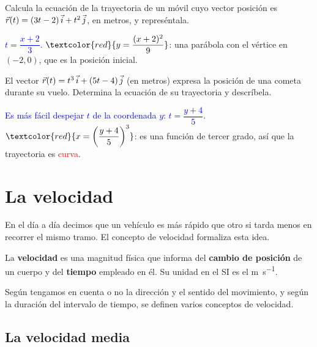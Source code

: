 \begin{exercise}
    Calcula la ecuación de la trayectoria de un móvil cuyo vector posición es \(\vec r(t) = (3t - 2)\,\vec{i} + t^2\,\vec{j}\), en
    metros, y represéntala.
    \begin{solu}
        \textcolor{blue}{\(t = \dfrac{x + 2}{3}\).} \(\textcolor{red}{y = \dfrac{(x + 2)^2}{9}}\): una parábola con el vértice en
        \((-2, 0)\), que es la posición inicial.
    \end{solu}
\end{exercise}

\begin{exercise}
    El vector \(\vec r(t) = t^3\,\vec{i} + (5t - 4)\,\vec{j}\) (en metros) expresa la posición de una cometa durante su vuelo.
    Determina la ecuación de su trayectoria y descríbela.
    \begin{solu}
        \textcolor{blue}{Es más fácil despejar \(t\) de la coordenada \(y\): \(t = \dfrac{y + 4}{5}\).}
        \(\textcolor{red}{x = \left(\dfrac{y + 4}{5}\right)^3}\): es una función de tercer grado, así que la trayectoria es
        \textcolor{red}{curva}.
    \end{solu}
\end{exercise}

\section{La velocidad}\label{sec:ud8-velocidad}

En el día a día decimos que un vehículo es más rápido que otro si tarda menos en recorrer el mismo tramo. El concepto de velocidad
formaliza esta idea.

\begin{definition}[Velocidad]
    La \textbf{velocidad} es una magnitud física que informa del \textbf{cambio de posición} de un cuerpo y del \textbf{tiempo}
    empleado en él. Su unidad en el SI es el \unit{\m\per\s}.
\end{definition}

Según tengamos en cuenta o no la dirección y el sentido del movimiento, y según la duración del intervalo de tiempo, se definen
varios conceptos de velocidad.

\subsection{La velocidad media}


